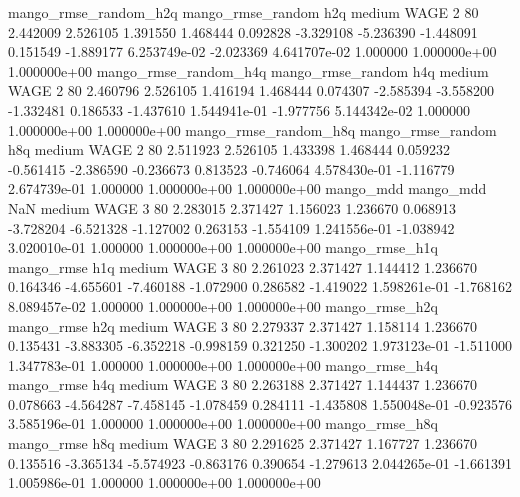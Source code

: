 mango_rmse_random_h2q mango_rmse_random                  h2q     medium     WAGE                 2 80  2.442009       2.526105 1.391550       1.468444    0.092828     -3.329108     -5.236390    -1.448091       0.151549 -1.889177 6.253749e-02    -2.023369   4.641707e-02            1.000000    1.000000e+00        1.000000e+00
mango_rmse_random_h4q mango_rmse_random                  h4q     medium     WAGE                 2 80  2.460796       2.526105 1.416194       1.468444    0.074307     -2.585394     -3.558200    -1.332481       0.186533 -1.437610 1.544941e-01    -1.977756   5.144342e-02            1.000000    1.000000e+00        1.000000e+00
mango_rmse_random_h8q mango_rmse_random                  h8q     medium     WAGE                 2 80  2.511923       2.526105 1.433398       1.468444    0.059232     -0.561415     -2.386590    -0.236673       0.813523 -0.746064 4.578430e-01    -1.116779   2.674739e-01            1.000000    1.000000e+00        1.000000e+00
            mango_mdd         mango_mdd                  NaN     medium     WAGE                 3 80  2.283015       2.371427 1.156023       1.236670    0.068913     -3.728204     -6.521328    -1.127002       0.263153 -1.554109 1.241556e-01    -1.038942   3.020010e-01            1.000000    1.000000e+00        1.000000e+00
       mango_rmse_h1q        mango_rmse                  h1q     medium     WAGE                 3 80  2.261023       2.371427 1.144412       1.236670    0.164346     -4.655601     -7.460188    -1.072900       0.286582 -1.419022 1.598261e-01    -1.768162   8.089457e-02            1.000000    1.000000e+00        1.000000e+00
       mango_rmse_h2q        mango_rmse                  h2q     medium     WAGE                 3 80  2.279337       2.371427 1.158114       1.236670    0.135431     -3.883305     -6.352218    -0.998159       0.321250 -1.300202 1.973123e-01    -1.511000   1.347783e-01            1.000000    1.000000e+00        1.000000e+00
       mango_rmse_h4q        mango_rmse                  h4q     medium     WAGE                 3 80  2.263188       2.371427 1.144437       1.236670    0.078663     -4.564287     -7.458145    -1.078459       0.284111 -1.435808 1.550048e-01    -0.923576   3.585196e-01            1.000000    1.000000e+00        1.000000e+00
       mango_rmse_h8q        mango_rmse                  h8q     medium     WAGE                 3 80  2.291625       2.371427 1.167727       1.236670    0.135516     -3.365134     -5.574923    -0.863176       0.390654 -1.279613 2.044265e-01    -1.661391   1.005986e-01            1.000000    1.000000e+00        1.000000e+00
